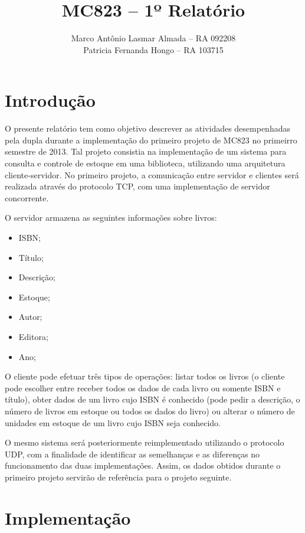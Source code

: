 \documentclass[11pt, brazil]{article} %
\title{MC823 -- 1º Relatório}
\author{Marco Antônio Lasmar Almada -- RA 092208 \\ Patricia Fernanda Hongo -- RA 103715}
\date{} %
\begin{document}
\maketitle

\section{Introdução}

O presente relatório tem como objetivo descrever as atividades desempenhadas pela dupla durante a implementação do primeiro projeto de MC823 no primeirro semestre de 2013. Tal projeto consistia na implementação de um sistema para consulta e controle de estoque em uma biblioteca, utilizando uma arquitetura cliente-servidor. No primeiro projeto, a comunicação entre servidor e clientes será realizada através do protocolo TCP, com uma implementação de servidor concorrente.

O servidor armazena as seguintes informações sobre livros:
\begin{itemize}
  \item ISBN;
  \item Título;
  \item Descrição;
  \item Estoque;
  \item Autor;
  \item Editora;
  \item Ano;  
\end{itemize}

O cliente pode efetuar três tipos de operações: listar todos os livros (o cliente pode escolher entre receber todos os dados de cada livro ou somente ISBN e título), obter dados de um livro cujo ISBN é conhecido (pode pedir a descrição, o número de livros em estoque ou todos os dados do livro) ou alterar o número de unidades em estoque de um livro cujo ISBN seja conhecido.

O mesmo sistema será posteriormente reimplementado utilizando o protocolo UDP, com a finalidade de identificar as semelhanças e as diferenças no funcionamento das duas implementações. Assim, os dados obtidos durante o primeiro projeto servirão de referência para o projeto seguinte.

\section{Implementação}
\end{document}
